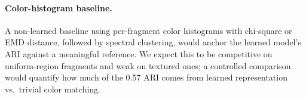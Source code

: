 \documentclass[12pt, a4paper]{article}
\begin{document}
\paragraph{Color-histogram baseline.}
A non-learned baseline using per-fragment color histograms with chi-square or EMD
distance, followed by spectral clustering, would anchor the learned model's ARI against
a meaningful reference. We expect this to be competitive on uniform-region fragments
and weak on textured ones; a controlled comparison would quantify how much of the 0.57
ARI comes from learned representation vs.\ trivial color matching.

\printbibliography
\end{document}
